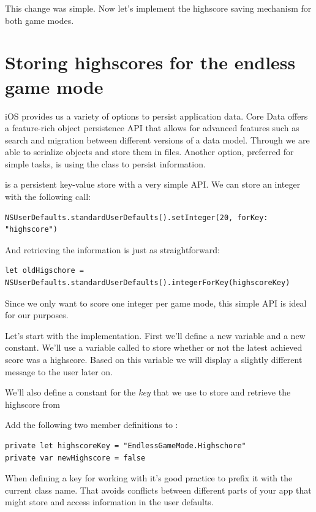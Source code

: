 This change was simple. Now let's implement the highscore saving mechanism for
both game modes.

\section{Storing highscores for the endless game mode}
iOS provides us a variety of options to persist application data. Core
Data offers a feature-rich object persistence API that allows for advanced features
such as search and migration between different versions of a data model. Through
 we are able to serialize objects and store them
in files. Another option, preferred for simple tasks, is using the
 class to persist information.

 is a persistent key-value store with a very simple
API. We can store an integer with the following call:
\begin{lstlisting}
NSUserDefaults.standardUserDefaults().setInteger(20, forKey: "highscore")
\end{lstlisting}

And retrieving the information is just as straightforward:
\begin{lstlisting}
let oldHigschore =
NSUserDefaults.standardUserDefaults().integerForKey(highscoreKey)
\end{lstlisting}

Since we only want to score one integer per game mode, this simple API is ideal
for our purposes.

Let's start with the implementation. First we'll define a new variable and a
new constant. We'll use a variable called  to store
whether or not the latest achieved score was a highscore. Based on this variable
we will display a slightly different message to the user later on.

We'll also define a constant for the \textit{key} that we use to store and
retrieve the highscore from 

\begin{leftbar}
Add the following two member definitions to :
\begin{lstlisting}
private let highscoreKey = "EndlessGameMode.Highschore"
private var newHighscore = false
\end{lstlisting}
\end{leftbar}

When defining a key for working with  it's good
practice to prefix it with the current class name. That avoids conflicts between
different parts of your app that might store and access information in the user
defaults.

